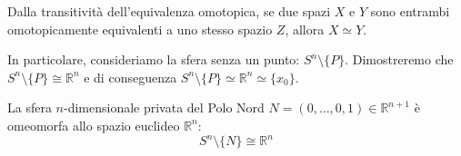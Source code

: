 \vspace{1.5em}

\begin{observacion}
Dalla transitività dell'equivalenza omotopica, se due spazi $X$ e $Y$ sono entrambi omotopicamente equivalenti a uno stesso spazio $Z$, allora $X \simeq Y$.

In particolare, consideriamo la sfera senza un punto: $S^n \setminus \{P\}$. Dimostreremo che $S^n \setminus \{P\} \cong \mathbb{R}^n$ e di conseguenza $S^n \setminus \{P\} \simeq \mathbb{R}^n \simeq \{x_0\}$.
\end{observacion}

\begin{prop}
La sfera $n$-dimensionale privata del Polo Nord $N = (0, \dots, 0, 1) \in \mathbb{R}^{n+1}$ è omeomorfa allo spazio euclideo $\mathbb{R}^n$:
\[
S^n \setminus \{N\} \cong \mathbb{R}^n
\]
\end{prop}

